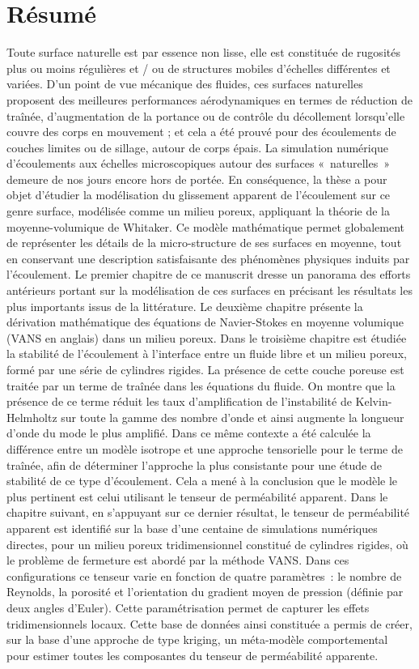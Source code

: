 \chapter*{Résumé}

Toute surface naturelle est par essence non lisse, elle est constituée de rugosités plus ou moins régulières et / ou de structures mobiles d’échelles différentes et variées. D’un point de vue mécanique des fluides, ces surfaces naturelles proposent des meilleures performances aérodynamiques en termes de réduction de traînée, d’augmentation de la portance ou de contrôle du décollement lorsqu’elle couvre des corps en mouvement ; et cela a été prouvé pour des écoulements de couches limites ou de sillage, autour de corps épais. La simulation numérique d’écoulements aux échelles microscopiques autour des surfaces « naturelles » demeure de nos jours encore hors de portée. En conséquence, la thèse a pour objet d’étudier la modélisation du glissement apparent de l’écoulement sur ce genre surface, modélisée comme un milieu poreux, appliquant la théorie de la moyenne-volumique de Whitaker. Ce modèle mathématique permet globalement de représenter les détails de la micro-structure de ses surfaces en moyenne, tout en conservant une description satisfaisante des phénomènes physiques induits par l’écoulement. 
Le premier chapitre de ce manuscrit dresse un panorama des efforts antérieurs portant sur la modélisation de ces surfaces en précisant les résultats les plus importants issus de la littérature. Le deuxième chapitre présente la dérivation mathématique des équations de Navier-Stokes en moyenne volumique (VANS en anglais) dans un milieu poreux. Dans le troisième chapitre est étudiée la stabilité de l’écoulement à l’interface entre un fluide libre et un milieu poreux, formé par une série de cylindres rigides. La présence de cette couche poreuse est traitée par un terme de traînée dans les équations du fluide. On montre que la présence de ce terme réduit les taux d’amplification de l’instabilité de Kelvin-Helmholtz sur toute la gamme des nombre d’onde et ainsi augmente la longueur d’onde du mode le plus amplifié. Dans ce même contexte a été calculée la différence entre un modèle isotrope et une approche tensorielle pour le terme de traînée, afin de déterminer l’approche la plus consistante pour une étude de stabilité de ce type d’écoulement. Cela a mené à la conclusion que le modèle le plus pertinent est celui utilisant le tenseur de perméabilité apparent. Dans le chapitre suivant, en s’appuyant sur ce dernier résultat, le tenseur de perméabilité apparent est identifié sur la base d’une centaine de simulations numériques directes, pour un milieu poreux tridimensionnel constitué de cylindres rigides, où le problème de fermeture est abordé par la méthode VANS. Dans ces configurations ce tenseur varie en fonction de quatre paramètres : le nombre de Reynolds, la porosité et l’orientation du gradient moyen de pression (définie par deux angles d’Euler). Cette paramétrisation permet de capturer les effets tridimensionnels locaux. Cette base de données ainsi constituée a permis de créer, sur la base d’une approche de type kriging, un méta-modèle comportemental pour estimer toutes les composantes du tenseur de perméabilité apparente.


